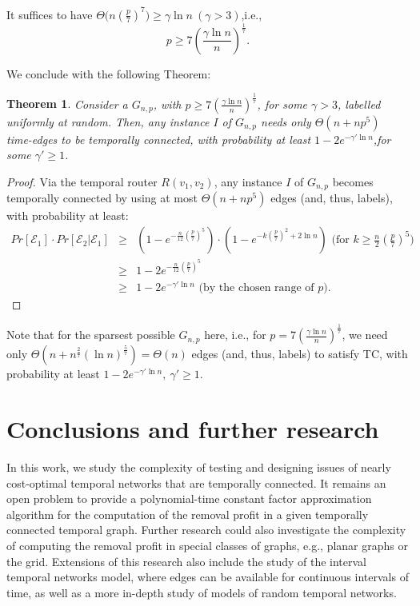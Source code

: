 \documentclass[a4paper,UKenglish]{article}
\newtheorem{theorem}{Theorem}
\begin{document}
It suffices to have $\Theta \big(  n\left(\frac{p}{7}\right)^7 \big) \geq \gamma \ln{n}~(\gamma>3)$,i.e., \[p \geq 7 \left( \frac{\gamma \ln{n}}{n} \right)^{\frac{1}{7}} . \]

We conclude with the following Theorem:
\begin{theorem}
Consider a $G_{n,p}$, with $p \geq 7 \left( \frac{\gamma \ln{n}}{n} \right)^{\frac{1}{7}}$, for some $\gamma>3$, labelled uniformly at random. Then, any instance $I$ of $G_{n,p}$ needs only $\Theta( n + n p^5 )$ time-edges to be temporally connected, with probability at least $1-2e^{-\gamma' \ln{n}}$,for some $\gamma' \geq 1$.
\end{theorem}
\begin{proof}
Via the temporal router $R(v_1,v_2)$, any instance $I$ of $G_{n,p}$ becomes temporally connected by using at most $\Theta(n+n p^5)$ edges (and, thus, labels), with probability at least:
\begin{eqnarray*}
Pr[\mathcal{E}_1] \cdot Pr[\mathcal{E}_2 | \mathcal{E}_1] & \geq & \left( 1- e^{-\frac{n}{12} \left( \frac{p}{7} \right)^5} \right) \cdot \left( 1- e^{-k (\frac{p}{7})^2 +2 \ln{n}} \right)  \text{ (for }     k \geq \frac{n}{2} \left( \frac{p}{7} \right)^5  \text{)} \\
 & \geq &  1- 2e^{-\frac{n}{12} \left( \frac{p}{7} \right)^5}\\
 & \geq &  1- 2e^{-\gamma' \ln{n}} \text{ (by the chosen range of } p \text{).}
\end{eqnarray*}
\end{proof}

Note that for the sparsest possible $G_{n,p}$ here, i.e., for $p= 7 \left( \frac{\gamma \ln{n}}{n} \right)^{\frac{1}{7}} $, we need only 
$\Theta(n+n^{\frac{2}{7}} (\ln{n})^{\frac{5}{7}}) = \Theta(n)$
 edges (and, thus, labels) to satisfy TC, with probability at least $1- 2e^{-\gamma' \ln{n}},~ \gamma' \geq 1$.


\section{Conclusions and further research}
In this work, we study the complexity of testing and designing issues of nearly cost-optimal temporal networks that are temporally connected. It remains an open problem to provide a polynomial-time constant factor approximation algorithm for the computation of the removal profit in a given temporally connected temporal graph. Further research could also investigate the complexity of computing the removal profit in special classes of graphs, e.g., planar graphs or the grid. Extensions of this research also include the study of the interval temporal networks model, where edges can be available for continuous intervals of time, as well as a more in-depth study of models of random temporal networks.
\end{document}
